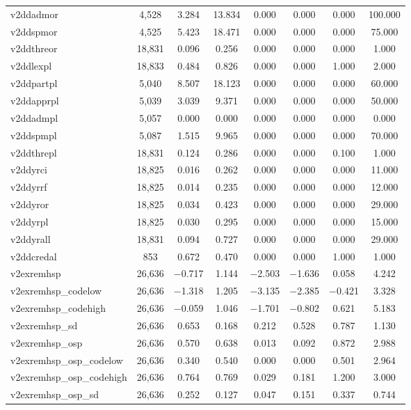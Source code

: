 \begin{table}[!htbp]
\begin{tabular}{@{\extracolsep{5pt}}lccccccc}
v2ddadmor & 4,528 & 3.284 & 13.834 & 0.000 & 0.000 & 0.000 & 100.000 \\ 
v2ddspmor & 4,525 & 5.423 & 18.471 & 0.000 & 0.000 & 0.000 & 75.000 \\ 
v2ddthreor & 18,831 & 0.096 & 0.256 & 0.000 & 0.000 & 0.000 & 1.000 \\ 
v2ddlexpl & 18,833 & 0.484 & 0.826 & 0.000 & 0.000 & 1.000 & 2.000 \\ 
v2ddpartpl & 5,040 & 8.507 & 18.123 & 0.000 & 0.000 & 0.000 & 60.000 \\ 
v2ddapprpl & 5,039 & 3.039 & 9.371 & 0.000 & 0.000 & 0.000 & 50.000 \\ 
v2ddadmpl & 5,057 & 0.000 & 0.000 & 0.000 & 0.000 & 0.000 & 0.000 \\ 
v2ddspmpl & 5,087 & 1.515 & 9.965 & 0.000 & 0.000 & 0.000 & 70.000 \\ 
v2ddthrepl & 18,831 & 0.124 & 0.286 & 0.000 & 0.000 & 0.100 & 1.000 \\ 
v2ddyrci & 18,825 & 0.016 & 0.262 & 0.000 & 0.000 & 0.000 & 11.000 \\ 
v2ddyrrf & 18,825 & 0.014 & 0.235 & 0.000 & 0.000 & 0.000 & 12.000 \\ 
v2ddyror & 18,825 & 0.034 & 0.423 & 0.000 & 0.000 & 0.000 & 29.000 \\ 
v2ddyrpl & 18,825 & 0.030 & 0.295 & 0.000 & 0.000 & 0.000 & 15.000 \\ 
v2ddyrall & 18,831 & 0.094 & 0.727 & 0.000 & 0.000 & 0.000 & 29.000 \\ 
v2ddcredal & 853 & 0.672 & 0.470 & 0.000 & 0.000 & 1.000 & 1.000 \\ 
v2exremhsp & 26,636 & $-$0.717 & 1.144 & $-$2.503 & $-$1.636 & 0.058 & 4.242 \\ 
v2exremhsp\_codelow & 26,636 & $-$1.318 & 1.205 & $-$3.135 & $-$2.385 & $-$0.421 & 3.328 \\ 
v2exremhsp\_codehigh & 26,636 & $-$0.059 & 1.046 & $-$1.701 & $-$0.802 & 0.621 & 5.183 \\ 
v2exremhsp\_sd & 26,636 & 0.653 & 0.168 & 0.212 & 0.528 & 0.787 & 1.130 \\ 
v2exremhsp\_osp & 26,636 & 0.570 & 0.638 & 0.013 & 0.092 & 0.872 & 2.988 \\ 
v2exremhsp\_osp\_codelow & 26,636 & 0.340 & 0.540 & 0.000 & 0.000 & 0.501 & 2.964 \\ 
v2exremhsp\_osp\_codehigh & 26,636 & 0.764 & 0.769 & 0.029 & 0.181 & 1.200 & 3.000 \\ 
v2exremhsp\_osp\_sd & 26,636 & 0.252 & 0.127 & 0.047 & 0.151 & 0.337 & 0.744 \\ 

\end{tabular}
\end{table}
